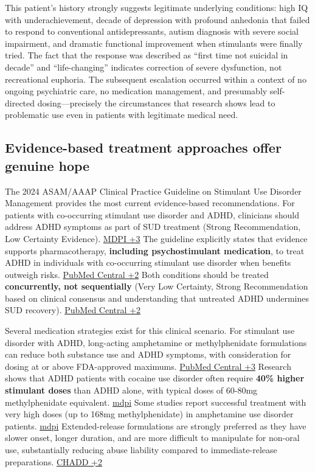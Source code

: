 This patient's history strongly suggests legitimate underlying conditions: high IQ with underachievement, decade of depression with profound anhedonia that failed to respond to conventional antidepressants, autism diagnosis with severe social impairment, and dramatic functional improvement when stimulants were finally tried. The fact that the response was described as ``first time not suicidal in decade'' and ``life-changing'' indicates correction of severe dysfunction, not recreational euphoria. The subsequent escalation occurred within a context of no ongoing psychiatric care, no medication management, and presumably self-directed dosing---precisely the circumstances that research shows lead to problematic use even in patients with legitimate medical need.

\subsection{Evidence-based treatment approaches offer genuine hope}\label{10c_self_medication-evidence-based-treatment-approaches-offer-genuine-hope}

The 2024 ASAM/AAAP Clinical Practice Guideline on Stimulant Use Disorder Management provides the most current evidence-based recommendations. For patients with co-occurring stimulant use disorder and ADHD, clinicians should address ADHD symptoms as part of SUD treatment (Strong Recommendation, Low Certainty Evidence). \href{https://www.mdpi.com/2077-0383/12/9/3096}{MDPI +3} The guideline explicitly states that evidence supports pharmacotherapy, \textbf{including psychostimulant medication}, to treat ADHD in individuals with co-occurring stimulant use disorder when benefits outweigh risks. \href{https://pmc.ncbi.nlm.nih.gov/articles/PMC2676785/}{PubMed Central +2} Both conditions should be treated \textbf{concurrently, not sequentially} (Very Low Certainty, Strong Recommendation based on clinical consensus and understanding that untreated ADHD undermines SUD recovery). \href{https://pmc.ncbi.nlm.nih.gov/articles/PMC11105801/}{PubMed Central +2}

Several medication strategies exist for this clinical scenario. For stimulant use disorder with ADHD, long-acting amphetamine or methylphenidate formulations can reduce both substance use and ADHD symptoms, with consideration for dosing at or above FDA-approved maximums. \href{https://pmc.ncbi.nlm.nih.gov/articles/PMC11105801/}{PubMed Central +3} Research shows that ADHD patients with cocaine use disorder often require \textbf{40\% higher stimulant doses} than ADHD alone, with typical doses of 60-80mg methylphenidate equivalent. \href{https://www.mdpi.com/2077-0383/12/9/3096}{mdpi} Some studies report successful treatment with very high doses (up to 168mg methylphenidate) in amphetamine use disorder patients. \href{https://www.mdpi.com/2077-0383/12/9/3096}{mdpi} Extended-release formulations are strongly preferred as they have slower onset, longer duration, and are more difficult to manipulate for non-oral use, substantially reducing abuse liability compared to immediate-release preparations. \href{https://chadd.org/attention-article/when-adhd-and-substance-use-disorders-coexist/}{CHADD +2}

